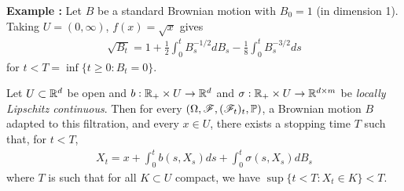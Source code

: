 \documentclass[12pt,a4paper]{article}
\begin{document}
\textbf{Example :} Let $B$ be a standard Brownian motion with $B_0 =1$ (in dimension 1). Taking $U=(0, \infty)$, $f(x) = \sqrt{x}$ gives
\begin{align*}
\sqrt{B_t} = 1+\frac{1}{2} \int_0^t B_s^{-1/2}dB_s - \frac{1}{8} \int_0^t B_s^{-3/2} ds
\end{align*}
for $t< T= \inf\{t\geq 0: B_t = 0 \}$.
\s

\thm Let $U\subset \mathbb{R}^d$ be open and $b: \mathbb{R}_+ \times U \rightarrow \mathbb{R}^d$ and $\sigma : \mathbb{R}_+ \times U \rightarrow \mathbb{R}^{d\times m}$ be \emph{locally Lipschitz continuous}. Then for every $(\Omega, \mathscr{F}, (\mathscr{F}_t)_t, \mathbb{P})$, a Brownian motion $B$ adapted to this filtration, and every $x\in U$, there exists a stopping time $T$ such that, for $t< T$,
\begin{align*}
X_t = x+ \int_0^t b(s, X_s) ds + \int_0^t \sigma(s, X_s) dB_s
\end{align*}
where $T$ is such that for all $K\subset U$ compact, we have $\sup\{t< T : X_t \in K \} < T$. 
\end{document}
